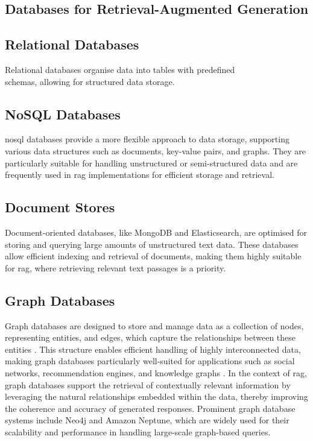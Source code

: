 \begin{definition}
\section{Databases for Retrieval-Augmented Generation}\label{sec:databases-rag}

\subsection{Relational Databases}\label{sec:relational-databases}
Relational databases organise data into tables with predefined\\ schemas, allowing for structured data storage. 

\subsection{NoSQL Databases}\label{sec:nosql-databases}
\ac{nosql} databases provide a more flexible approach to data storage, supporting various data structures such as documents, key-value pairs, and graphs. 
They are particularly suitable for handling unstructured or semi-structured data and are frequently used in \ac{rag} implementations for efficient storage and retrieval.

\subsection{Document Stores}\label{sec:document-stores}
Document-oriented databases, like MongoDB and Elasticsearch, are optimised for storing and querying large amounts of unstructured text data. 
These databases allow efficient indexing and retrieval of documents, making them highly suitable for \ac{rag}, where retrieving relevant text passages is a priority.
\subsection{Graph Databases}\label{sec:graph-databases}
Graph databases are designed to store and manage data as a collection of nodes, representing entities, and edges, which capture the relationships between these entities \citep{Robinson2015}. 
This structure enables efficient handling of highly interconnected data, making graph databases particularly well-suited for applications such as social networks, recommendation engines, and knowledge graphs \citep{Angles2008}. 
In the context of \ac{rag}, graph databases support the retrieval of contextually relevant information by leveraging the natural relationships embedded within the data, thereby improving the coherence and accuracy of generated responses. 
Prominent graph database systems include Neo4j and Amazon Neptune, which are widely used for their scalability and performance in handling large-scale graph-based queries.


\end{definition}
